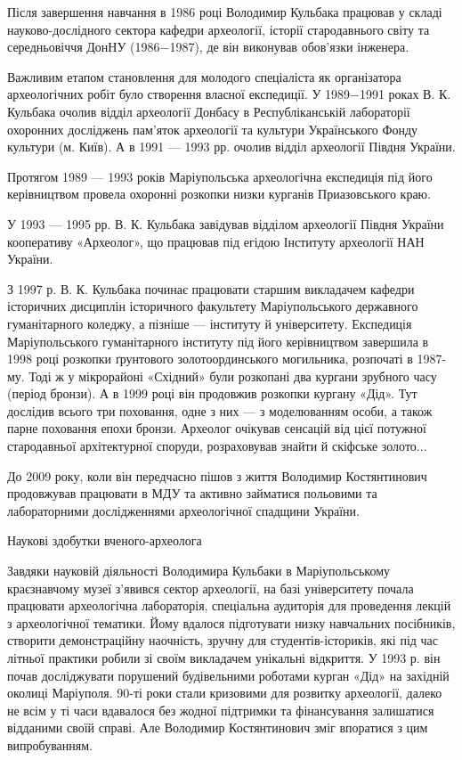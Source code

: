 Після завершення навчання в 1986 році Володимир Кульбака працював у складі
науково-дослідного сектора кафедри археології, історії стародавнього світу та
середньовіччя ДонНУ (1986−1987), де він виконував обов'язки інженера.

Важливим етапом становлення для молодого спеціаліста як організатора
археологічних робіт було створення власної експедиції. У 1989−1991 роках В. К.
Кульбака очолив відділ археології Донбасу в Республіканській лабораторії
охоронних досліджень пам'яток археології та культури Українського Фонду
культури (м. Київ). А в 1991 — 1993 рр. очолив відділ археології Півдня
України.

Протягом 1989 — 1993 років Маріупольська археологічна експедиція під його
керівництвом провела охоронні розкопки низки курганів Приазовського краю.

У 1993 — 1995 рр. В. К. Кульбака завідував відділом археології Півдня України
кооперативу «Археолог», що працював під егідою Інституту археології НАН
України.

З 1997 р. В. К. Кульбака починає працювати старшим викладачем кафедри
історичних дисциплін історичного факультету Маріупольського державного
гуманітарного коледжу, а пізніше — інституту й університету. Експедиція
Маріупольського гуманітарного інституту під його керівництвом завершила в 1998
році розкопки ґрунтового золотоординського могильника, розпочаті в 1987-му.
Тоді ж у мікрорайоні «Східний» були розкопані два кургани зрубного часу (період
бронзи). А в 1999 році він продовжив розкопки кургану «Дід». Тут дослідив
всього три поховання, одне з них — з моделюванням особи, а також парне
поховання епохи бронзи. Археолог очікував сенсацій від цієї потужної
стародавньої архітектурної споруди, розраховував знайти й скіфське золото...

До 2009 року, коли він передчасно пішов з життя Володимир Костянтинович
продовжував працювати в МДУ та активно займатися польовими та лабораторними
дослідженнями археологічної спадщини України.

Наукові здобутки вченого-археолога

Завдяки науковій діяльності Володимира Кульбаки в Маріупольському краєзнавчому
музеї з'явився сектор археології, на базі університету почала працювати
археологічна лабораторія, спеціальна аудиторія для проведення лекцій з
археологічної тематики. Йому вдалося підготувати низку навчальних посібників,
створити демонстраційну наочність, зручну для студентів-істориків, які під час
літньої практики робили зі своїм викладачем унікальні відкриття. У 1993 р. він
почав досліджувати порушений будівельними роботами курган «Дід» на західній
околиці Маріуполя. 90-ті роки стали кризовими для розвитку археології, далеко
не всім у ті часи вдавалося без жодної підтримки та фінансування залишатися
відданими своїй справі. Але Володимир Костянтинович зміг впоратися з цим
випробуванням.

